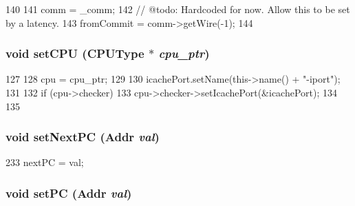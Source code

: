 \begin{DoxyCode}
140 {
141     comm = _comm;
142     // @todo: Hardcoded for now.  Allow this to be set by a latency.
143     fromCommit = comm->getWire(-1);
144 }
\end{DoxyCode}
\hypertarget{classFrontEnd_a565fc31c4022b672a5c6b03a3dbcb408}{
\subsubsection[{setCPU}]{\setlength{\rightskip}{0pt plus 5cm}void setCPU ({\bf CPUType} $\ast$ {\em cpu\_\-ptr})}}
\label{classFrontEnd_a565fc31c4022b672a5c6b03a3dbcb408}



\begin{DoxyCode}
127 {
128     cpu = cpu_ptr;
129 
130     icachePort.setName(this->name() + "-iport");
131 
132     if (cpu->checker) {
133         cpu->checker->setIcachePort(&icachePort);
134     }
135 }
\end{DoxyCode}
\hypertarget{classFrontEnd_a81b908e5de6420bc0c5a0c5b9b1e38c2}{
\subsubsection[{setNextPC}]{\setlength{\rightskip}{0pt plus 5cm}void setNextPC ({\bf Addr} {\em val})}}
\label{classFrontEnd_a81b908e5de6420bc0c5a0c5b9b1e38c2}



\begin{DoxyCode}
233 { nextPC = val; }
\end{DoxyCode}
\hypertarget{classFrontEnd_a9bd96a8460a26f24f520db702f3f6eec}{
\subsubsection[{setPC}]{\setlength{\rightskip}{0pt plus 5cm}void setPC ({\bf Addr} {\em val})}}
\label{classFrontEnd_a9bd96a8460a26f24f520db702f3f6eec}




